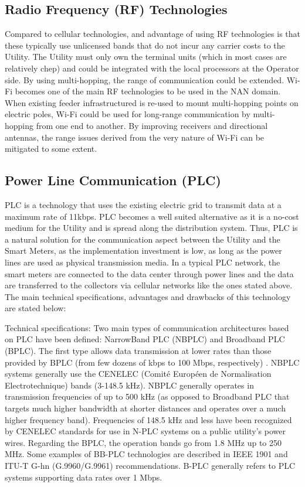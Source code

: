 \documentclass[11pt,final,onecolumn]{IEEEtran}
\begin{document}
\subsection{Radio Frequency (RF) Technologies}

Compared to cellular technologies, and advantage of using RF technologies is that these typically use unlicensed bands that do not incur any carrier costs to the Utility. The Utility must only own the terminal units (which in most cases are relatively chep) and could be integrated with the local processors at the Operator side. By using multi-hopping, the range of communication could be extended. Wi-Fi becomes one of the main RF technologies to be used in the NAN domain. When existing feeder infrastructured is re-used to mount multi-hopping points on electric poles, Wi-Fi could be used for long-range communication by multi-hopping from one end to another. By improving receivers and directional antennas, the range issues derived from the very nature of Wi-Fi can be mitigated to some extent.


\subsection{Power Line Communication (PLC)}\label{plc}

PLC is a technology that uses the existing electric grid to transmit data at a maximum rate of 11kbps. PLC becomes a well suited alternative as it is a no-cost medium for the Utility and is spread along the distribution system. Thus, PLC is a natural solution for the communication aspect between the Utility and the Smart Meters, as the implementation investment is low, as long as the power lines are used as physical transmission media.
In a typical PLC network, the smart meters are connected to the data center through power lines and the data are transferred to the collectors via cellular networks like the ones stated above. 
The main technical specifications, advantages and drawbacks of this technology are stated below:

Technical specifications: Two main types of communication architectures based on PLC have been defined: NarrowBand PLC (NBPLC) and Broadband PLC (BPLC). The first type allows data transmission at lower rates than those provided by BPLC (from few dozens of kbps to 100 Mbps, respectively) \cite{Sabbah2014}. NBPLC systems generally use the CENELEC (Comité Européen de Normalisation Electrotechnique) bands (3-148.5 kHz). NBPLC generally operates in transmission frequencies of up to 500 kHz (as opposed to Broadband PLC that targets much higher bandwidth at shorter distances and operates over a much higher frequency band). Frequencies of 148.5 kHz and less have been recognized by CENELEC standards for use in N-PLC systems on a public utility’s power wires. Regarding the BPLC, the operation bands go from 1.8 MHz up to 250 MHz. Some examples of BB-PLC technologies are described in IEEE 1901 and ITU-T G-hn (G.9960/G.9961) recommendations. B-PLC generally refers to PLC systems supporting data rates over 1 Mbps.
\end{document}
